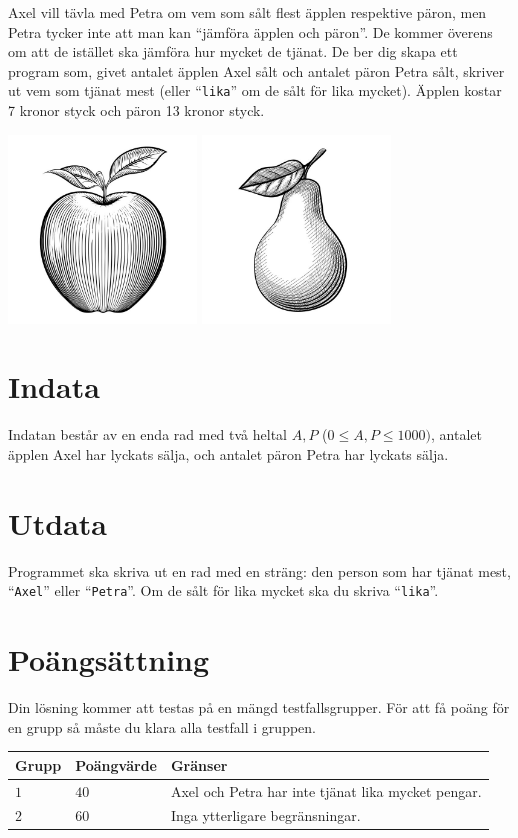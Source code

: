 Axel vill tävla med Petra om vem som sålt flest äpplen respektive päron, men Petra tycker inte att man kan ``jämföra äpplen och päron''. De kommer överens om att de istället ska jämföra hur mycket de tjänat. De ber dig skapa ett program som, givet antalet äpplen Axel sålt och antalet päron Petra sålt, skriver ut vem som tjänat mest (eller ``\texttt{lika}'' om de sålt för lika mycket). Äpplen kostar 7 kronor styck och päron 13 kronor styck.

\begin{center}
  \includegraphics[width=5cm]{apple.jpg}
  \includegraphics[width=5cm]{pear.jpg}
\end{center}

\section*{Indata}
Indatan består av en enda rad med två heltal $A,P$ ($0 \le A,P \le 1000)$, antalet äpplen Axel har lyckats sälja, och antalet päron Petra har lyckats sälja. 

\section*{Utdata}
Programmet ska skriva ut en rad med en sträng: den person som har tjänat mest, ``\texttt{Axel}'' eller ``\texttt{Petra}''. Om de sålt för lika mycket ska du skriva ``\texttt{lika}''.

\section*{Poängsättning}
Din lösning kommer att testas på en mängd testfallsgrupper.
För att få poäng för en grupp så måste du klara alla testfall i gruppen.

\noindent
\begin{tabular}{| l | l | l |}
  \hline
  Grupp & Poängvärde & Gränser \\ \hline
  $1$   & $40$       & Axel och Petra har inte tjänat lika mycket pengar. \\ \hline
  $2$   & $60$       & Inga ytterligare begränsningar. \\ \hline
\end{tabular}
